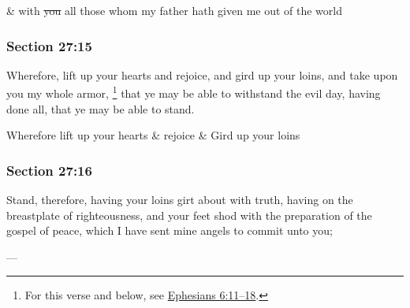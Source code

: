 		\begin{framed}
		\scriptsize
			\begin{compactdesc}
				\item[JSP] \& with \sout{you} all those whom my father hath given me out of the world
			\end{compactdesc}
		\end{framed}

	\subsubsection{Section 27:15} %
		\label{DC27-15}

		Wherefore, lift up your hearts and rejoice, and gird up your loins, and take upon you my whole armor,%
			\footnote{%
				For this verse and below, see \hyperref[EPHESIANS-6-11]{Ephesians 6:11--18}.
				}
		that ye may be able to withstand the evil day, having done all, that ye may be able to stand.

		\begin{framed}
		\scriptsize
			\begin{compactdesc}
				\item[JSP] Wherefore lift up your hearts \& rejoice \& Gird up your loins
			\end{compactdesc}
		\end{framed}

	\subsubsection{Section 27:16} %
		\label{DC27-16}

		Stand, therefore, having your loins girt about with truth, having on the breastplate of righteousness, and your feet shod with the preparation of the gospel of peace, which I have sent mine angels to commit unto you;

		\begin{framed}
		\scriptsize
			\begin{compactdesc}
				\item[JSP] ---
			\end{compactdesc}
		\end{framed}

